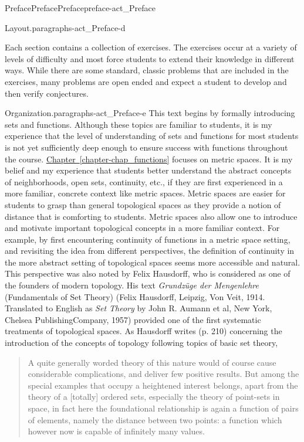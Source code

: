 \documentclass[oneside,10pt,]{book}
\newcommand{\xreffont}{\relax}
\newcommand{\pubtitle}[1]{\textsl{#1}}
\numberwithin{equation}{chapter}
\begin{document}
\begin{preface}{Preface}{Preface}{}{Preface}{}{}{preface-act_Preface}
\begin{paragraphs}{Layout.}{paragraphs-act_Preface-d}
\begin{itemize}[label=\textbullet]
\end{itemize}
%
\par
Each section contains a collection of exercises. The exercises occur at a variety of levels of difficulty and most force students to extend their knowledge in different ways. While there are some standard, classic problems that are included in the exercises, many problems are open ended and expect a student to develop and then verify conjectures.%
\end{paragraphs}%
\begin{paragraphs}{Organization.}{paragraphs-act_Preface-e}%
This text begins by formally introducing sets and functions. Although these topics are familiar to students, it is my experience that the level of understanding of sets and functions for most students is not yet sufficiently deep enough to ensure success with functions throughout the course. \hyperref[chapter-chap_functions]{Chapter~{\xreffont\ref{chapter-chap_functions}}} focuses on metric spaces. It is my belief and my experience that students better understand the abstract concepts of neighborhoods, open sets, continuity, etc., if they are first experienced in a more familiar, concrete context like metric spaces. Metric spaces are easier for students to grasp than general topological spaces as they provide a notion of distance that is comforting to students. Metric spaces also allow one to introduce and motivate important topological concepts in a more familiar context. For example, by first encountering continuity of functions in a metric space setting, and revisiting the idea from different perspectives, the definition of continuity in the more abstract setting of topological spaces seems more accessible and natural. This perspective was also noted by Felix Hausdorff, who is considered as one of the founders of modern topology. His text \pubtitle{Grundzüge der Mengenlehre} (Fundamentals of Set Theory) (Felix Hausdorff, Leipzig, Von Veit, 1914. Translated to English as \pubtitle{Set Theory} by John R. Aumann et al, New York, Chelsea PublishingCompany, 1957) provided one of the first systematic treatments of topological spaces. As Hausdorff writes (p. 210) concerning the introduction of the concepts of topology following topics of basic set theory,%
\begin{quote}%
A quite generally worded theory of this nature would of course cause considerable complications, and deliver few positive results. But among the special examples that occupy a heightened interest belongs, apart from the theory of a [totally] ordered sets, especially the theory of point-sets in space, in fact here the foundational relationship is again a function of pairs of elements, namely the distance between two points: a function which however now is capable of infinitely many values.%

\end{quote}
\end{paragraphs}
\end{preface}
\end{document}
